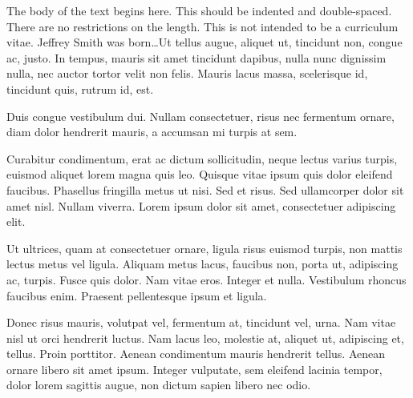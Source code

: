 \documentclass{MUthesis}
\begin{document}
\backmatter %
\nocite{*}



\begin{vita} %
The body of the text begins here. This should be indented and double-spaced.
There are no restrictions on the length. This is not intended to be a
curriculum vitae. Jeffrey Smith was born\dots Ut tellus augue, aliquet ut,
tincidunt non, congue ac, justo. In tempus, mauris sit amet tincidunt dapibus,
nulla nunc dignissim nulla, nec auctor tortor velit non felis. Mauris lacus
massa, scelerisque id, tincidunt quis, rutrum id, est.

Duis congue vestibulum dui. Nullam consectetuer, risus nec fermentum ornare,
diam dolor hendrerit mauris, a accumsan mi turpis at sem.

Curabitur condimentum, erat ac dictum sollicitudin, neque lectus varius turpis,
euismod aliquet lorem magna quis leo. Quisque vitae ipsum quis dolor eleifend
faucibus. Phasellus fringilla metus ut nisi. Sed et risus. Sed ullamcorper
dolor sit amet nisl. Nullam viverra. Lorem ipsum dolor sit amet, consectetuer
adipiscing elit.

Ut ultrices, quam at consectetuer ornare, ligula risus euismod turpis, non
mattis lectus metus vel ligula. Aliquam metus lacus, faucibus non, porta ut,
adipiscing ac, turpis. Fusce quis dolor. Nam vitae eros. Integer et nulla.
Vestibulum rhoncus faucibus enim. Praesent pellentesque ipsum et ligula.

Donec risus mauris, volutpat vel, fermentum at, tincidunt vel, urna. Nam vitae
nisl ut orci hendrerit luctus. Nam lacus leo, molestie at, aliquet ut,
adipiscing et, tellus. Proin porttitor. Aenean condimentum mauris hendrerit
tellus. Aenean ornare libero sit amet ipsum. Integer vulputate, sem eleifend
lacinia tempor, dolor lorem sagittis augue, non dictum sapien libero nec odio.
\end{vita}
\end{document}

